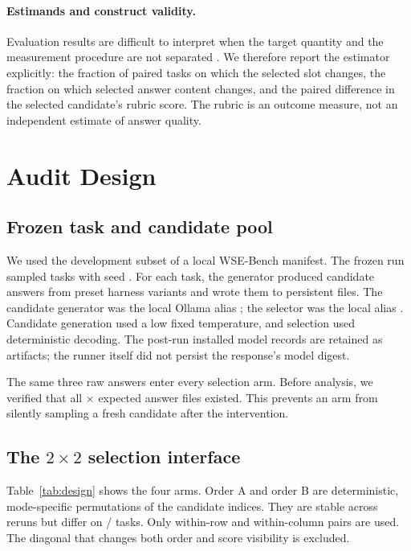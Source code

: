 \documentclass[11pt]{article}
\begin{document}
\paragraph{Estimands and construct validity.}
Evaluation results are difficult to interpret when the target quantity and the measurement
procedure are not separated \citep{binette2024estimands,freiesleben2025epistemology}. We therefore
report the estimator explicitly: the fraction of paired tasks on which the selected slot changes,
the fraction on which selected answer content changes, and the paired difference in the selected
candidate's rubric score. The rubric is an outcome measure, not an independent estimate of answer
quality.

\section{Audit Design}

\subsection{Frozen task and candidate pool}

We used the development subset of a local WSE-Bench manifest. The frozen run sampled
\DesignTasks{} tasks with seed \SampleSeed. For each task, the generator produced
\DesignCandidates{} candidate answers from preset harness variants and wrote them to persistent files.
The candidate generator was the local Ollama alias \texttt{\GeneratorModel}; the selector was the
local alias \texttt{\SelectorModel}. Candidate generation used a low fixed temperature, and selection
used deterministic decoding. The post-run installed model records are retained as artifacts; the
runner itself did not persist the response's model digest.

The same three raw answers enter every selection arm. Before analysis, we verified that all
\DesignTasks{} \(\times\) \DesignCandidates{} expected answer files existed. This prevents an arm from
silently sampling a fresh candidate after the intervention.

\subsection{The \texorpdfstring{\(2\times2\)}{2x2} selection interface}

Table~\ref{tab:design} shows the four arms. Order A and order B are deterministic, mode-specific
permutations of the candidate indices. They are stable across reruns but differ on
\OrderContractDiffer/\DesignTasks{} tasks. Only within-row and within-column pairs are used. The
diagonal that changes both order and score visibility is excluded.
\end{document}
